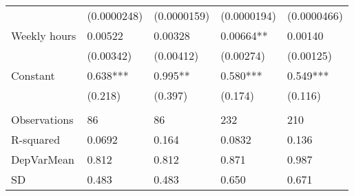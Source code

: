\begin{tabular}{lllll}
      & (0.0000248) & (0.0000159) & (0.0000194) & (0.0000466) \\
Weekly hours & 0.00522 & 0.00328 & 0.00664** & 0.00140 \\
      & (0.00342) & (0.00412) & (0.00274) & (0.00125) \\
Constant & 0.638*** & 0.995** & 0.580*** & 0.549*** \\
      & (0.218) & (0.397) & (0.174) & (0.116) \\
      &       &       &       &  \\
\midrule
Observations & 86    & 86    & 232   & 210 \\
R-squared & 0.0692 & 0.164 & 0.0832 & 0.136 \\
DepVarMean & 0.812 & 0.812 & 0.871 & 0.987 \\
SD    & 0.483 & 0.483 & 0.650 & 0.671 \\
\bottomrule
\bottomrule
\end{tabular}%
